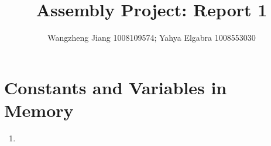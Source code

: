 \documentclass[11pt]{article}
\title{Assembly Project: Report 1}
\author{Wangzheng Jiang 1008109574; Yahya Elgabra 1008553030}
\begin{document}
\maketitle

\section{Constants and Variables in Memory}
\begin{enumerate}

\item 

	
\end{enumerate}
\end{document}
